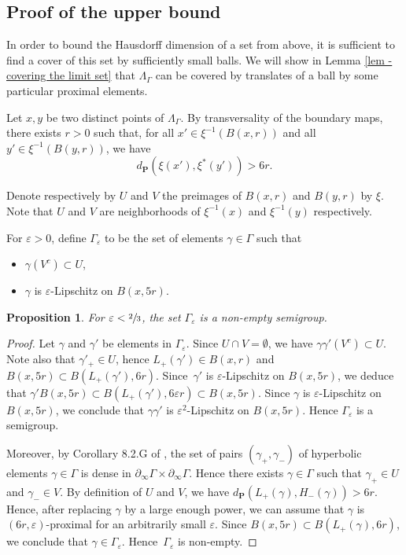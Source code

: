 \documentclass[11pt]{article}
\numberwithin{equation}{section}
\newtheorem{prop}[theo]{Proposition}
\theoremstyle{definition}
\newcommand{\proj}{\mathbf{P}}
\let\epsilon\varepsilon
\let\G\Gamma
\let\g\gamma
\begin{document}
\subsection{Proof of the upper bound}
In order to bound the Hausdorff dimension of a set from above, it is sufficient to find a cover of this set by sufficiently small balls. We will show in Lemma \ref{lem - covering the limit set} that $\Lambda_\Gamma$ can be covered by translates of a ball by some particular proximal elements.

Let $x,y$ be two distinct points of $\Lambda_\Gamma$. By transversality of the boundary maps, there exists $r>0$ such that, for all $x'\in \xi^{-1}(B(x,r))$ and all $y' \in \xi^{-1}(B(y,r))$, we have
\[d_\proj(\xi(x'), \xi^*(y')) > 6r.\]

Denote respectively by $U$ and $V$ the preimages of $B(x,r)$ and $B(y,r)$ by $\xi$. Note that $U$ and $V$ are neighborhoods of $\xi^{-1}(x)$ and $\xi^{-1}(y)$ respectively.

For $\epsilon>0$, define $\G_\epsilon$ to be the set of elements $\g\in \G$ such that
\begin{itemize}
\item $\g(V^c)\subset U$,
\item $\g$ is $\epsilon$-Lipschitz on $B(x, 5r)$.
\end{itemize}

\begin{prop}
For $\epsilon < \sfrac{2}{3}$, the set $\Gamma_\epsilon$ is a non-empty semigroup.
\end{prop}

\begin{proof}
Let $\gamma$ and $\gamma'$ be elements in $\G_\epsilon$. Since $U\cap V = \emptyset$, we have $\gamma\gamma'(V^c) \subset U$.
Note also that $\gamma'_+ \in U$, hence $L_+(\gamma')\in B(x,r)$ and $B(x,5r) \subset B(L_+(\gamma'),6r)$. Since~$\gamma'$ is $\epsilon$-Lipschitz on $B(x,5r)$, we deduce that $\gamma' B(x,5r) \subset B(L_+(\gamma'), 6\epsilon r) \subset B(x,5r)$. Since $\gamma$ is $\epsilon$-Lipschitz on $B(x,5r)$, we conclude that $\gamma \gamma'$ is $\epsilon^2$-Lipschitz on $B(x, 5r)$. Hence $\Gamma_\epsilon$ is a semigroup.

Moreover, by Corollary 8.2.G of \cite{Gromov}, the set of pairs $(\g_+,\g_-)$ of hyperbolic elements $\g\in\G$ is dense in $\partial_\infty \G\times\partial_\infty\G$. Hence there exists $\gamma \in \Gamma$ such that $\gamma_+ \in U$ and $\gamma_-\in V$. By definition of $U$ and $V$, we have $d_\proj(L_+(\gamma),H_-(\gamma)) > 6r$. Hence, after replacing $\gamma$ by a large enough power, we can assume that $\gamma$ is $(6r,\epsilon)$-proximal for an arbitrarily small $\epsilon$. Since $B(x,5r)\subset B(L_+(\gamma), 6r)$, we conclude that $\gamma \in \Gamma_\epsilon$. Hence~$\Gamma_\epsilon$ is non-empty.
\end{proof}
\end{document}
